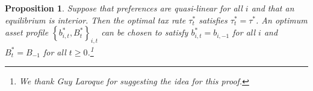 \documentclass[thmsb,11pt]{article}
\newtheorem{proposition}{Proposition}
\newenvironment{proof}[1][Proof]{\noindent \textbf{#1.} }{\  \rule{0.5em}{0.5em}}
\begin{document}
\begin{proposition}
\label{Prop: quasilinear} Suppose that preferences are quasi-linear for all $%
i$ and that an equilibrium is interior. Then the optimal tax rate $\tau
_{t}^{\ast }$ satisfies $\tau _{t}^{\ast }=\tau ^{\ast }$. An optimum asset
profile $\left \{ b_{i,t}^{\ast },B_{t}^{\ast }\right \} _{i,t}$ can be
chosen to satisfy $b_{i,t}^{\ast }=b_{i,-1}$ for all $i$ and $%
B_{t}^{\ast }=B_{-1}$ for all $t\geq 0$.\footnote{%
We thank Guy Laroque for suggesting the idea for this proof.}
\end{proposition}
%
\end{document}

